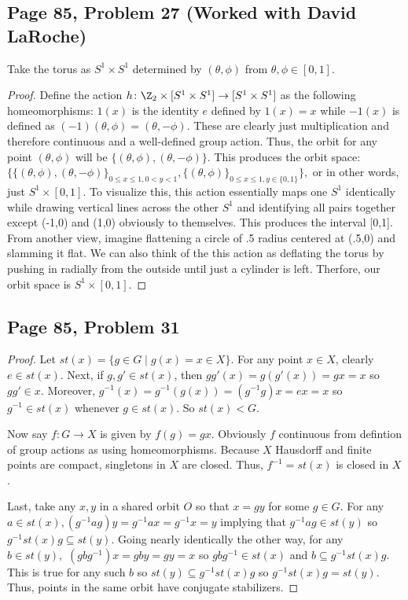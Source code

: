 \subsection*{Page 85, Problem 27 (Worked with David LaRoche)}

Take the torus as $S^1\times S^1$ determined by $(\theta, \phi)$ from $\theta, \phi \in [0, 1].$

\begin{proof}
    Define the action $h\colon\Z_2\times[S^1\times S^1]\to[S^1\times S^1]$ as the following homeomorphisms: $1(x)$ is the identity $e$ defined by $1(x) = x$ while $-1(x)$ is defined as $(-1)(\theta, \phi) = (\theta, -\phi)$. These are clearly just multiplication and therefore continuous and a well-defined group action. Thus, the orbit for any point $(\theta, \phi)$ will be $\{(\theta, \phi), (\theta, -\phi)\}$. This produces the orbit space: $\{\{(\theta, \phi), (\theta, -\phi)\}_{0\leq x \leq 1, 0 < y < 1}, \{(\theta, \phi)\}_{0 \leq x \leq 1, y \in \{0, 1\}}\},$ or in other words, just $S^1 \times [0,1]$. To visualize this, this action essentially maps one $S^1$ identically while drawing vertical lines across the other $S^1$ and identifying all pairs together except (-1,0) and (1,0) obviously to themselves. This produces the interval [0,1]. From another view, imagine flattening a circle of .5 radius centered at (.5,0) and slamming it flat. We can also think of the this action as deflating the torus by pushing in radially from the outside until just a cylinder is left. Therfore, our orbit space is $S^1 \times [0,1]$.
\end{proof}

\subsection*{Page 85, Problem 31}
\vspace{10pt}
\begin{proof}
    Let $st(x) = \{g \in G \mid g(x)=x \in X\}$. For any point $x \in X$, clearly $e \in st(x)$. Next, if $g, g' \in st(x)$, then $gg'(x) = g(g'(x)) = gx = x$ so $gg' \in x$. Moreover, $g^{-1}(x) = g^{-1}(g(x)) = (g^{-1}g)x = ex = x$ so $g^{-1} \in st(x)$ whenever $g \in st(x)$. So $st(x) < G$.

    Now say $f\colon G\to X$ is given by $f(g) = gx.$ Obviously $f$ continuous from defintion of group actions as using homeomorphisms. Because $X$ Hausdorff and finite points are compact, singletons in $X$ are closed. Thus, $f^{-1} = st(x)$ is closed in $X$.

    Last, take any $x,y$ in a shared orbit $O$ so that $x = gy$ for some $g \in G$. For any $a \in st(x), (g^{-1}ag)y = g^{-1}ax=g^{-1}x=y$ implying that $g^{-1}ag \in st(y)$ so $g^{-1}st(x)g \subseteq st(y)$. Going nearly identically the other way, for any $b \in st(y),$ $(gbg^{-1})x = gby = gy = x$ so $gbg^{-1} \in st(x)$ and $b \subseteq g^{-1}st(x)g$. This is true for any such $b$ so $st(y) \subseteq g^{-1}st(x)g$ so $g^{-1}st(x)g=st(y)$. Thus, points in the same orbit have conjugate stabilizers. 
\end{proof}